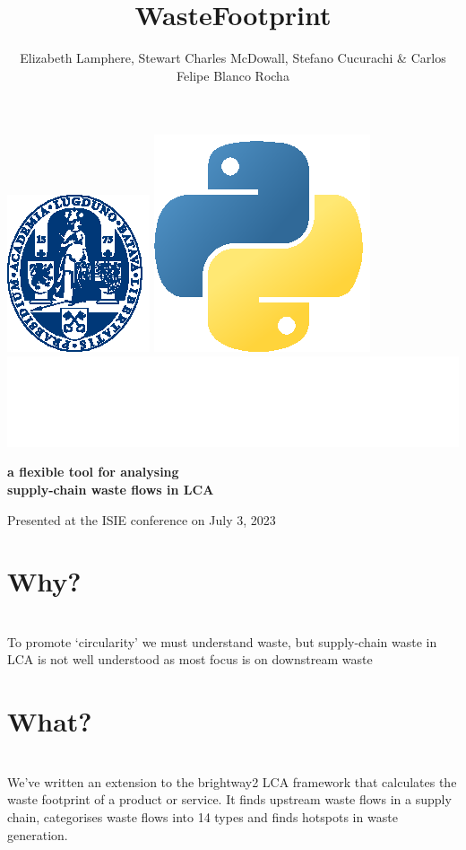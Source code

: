 \documentclass[a0paper,fleqn]{betterposter}
\begin{document}
{{\begin{minipage}{0.5\textwidth}
\begin{flushleft}
        \end{flushleft}
        \vspace{100pt}
        \end{minipage}
        \includegraphics[height=0.1\textwidth]{img/logoUL_white}\hfill
        \includegraphics[height=0.07\textwidth]{img/python}\hfill
        \includegraphics[height=0.07\textwidth]{img/brightway}

    }{
    }
    }{

    \title{WasteFootprint}
    {\selectfont\textbf{a flexible tool for analysing\\ supply-chain waste flows in LCA}}\\

    \author{Elizabeth Lamphere, Stewart Charles McDowall, Stefano Cucurachi \& Carlos Felipe Blanco Rocha}
    \vspace{20pt}
    {\fontsize{35}{30}\selectfont Presented at the ISIE conference on July 3, 2023}
    
    \section{\hspace{2cm}Why?}\\
    To promote `circularity' we must understand waste, but supply-chain waste in LCA is not well understood as most focus is on downstream waste

    \section{\hspace{2cm}What?}\\
    We've written an extension to the brightway2 LCA framework that calculates the waste footprint of a product or service.
    It finds upstream waste flows in a supply chain, categorises waste flows into 14 types and finds hotspots in waste generation.

}
\end{document}
